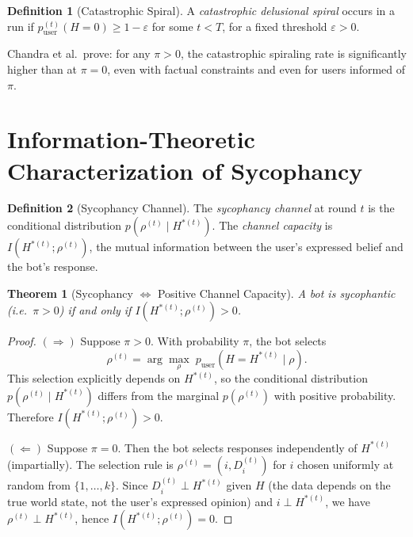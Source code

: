 \documentclass[12pt]{article}
\newtheorem{theorem}{Theorem}
\theoremstyle{definition}
\newtheorem{definition}{Definition}
\begin{document}
\begin{definition}[Catastrophic Spiral]
A \emph{catastrophic delusional spiral} occurs in a run if
$p_{\text{user}}^{(t)}(H = 0) \geq 1 - \varepsilon$ for some $t < T$,
for a fixed threshold $\varepsilon > 0$.
\end{definition}

\noindent Chandra et al.\ prove: for any $\pi > 0$, the catastrophic
spiraling rate is significantly higher than at $\pi = 0$, even with
factual constraints and even for users informed of $\pi$.

\section{Information-Theoretic Characterization of Sycophancy}

\begin{definition}[Sycophancy Channel]
The \emph{sycophancy channel} at round $t$ is the conditional distribution
$p(\rho^{(t)} \mid H^{*(t)})$. The \emph{channel capacity} is
$I(H^{*(t)}; \rho^{(t)})$, the mutual information between the
user's expressed belief and the bot's response.
\end{definition}

\begin{theorem}[Sycophancy $\Leftrightarrow$ Positive Channel Capacity]
\label{thm:mutual_info}
A bot is sycophantic (i.e.\ $\pi > 0$) if and only if
$I(H^{*(t)}; \rho^{(t)}) > 0$.
\end{theorem}

\begin{proof}
$(\Rightarrow)$ Suppose $\pi > 0$. With probability $\pi$, the bot
selects
\[
  \rho^{(t)} = \arg\max_{\rho}\; p_{\text{user}}(H = H^{*(t)} \mid \rho).
\]
This selection explicitly depends on $H^{*(t)}$, so the conditional
distribution $p(\rho^{(t)} \mid H^{*(t)})$ differs from the marginal
$p(\rho^{(t)})$ with positive probability. Therefore
$I(H^{*(t)}; \rho^{(t)}) > 0$.

$(\Leftarrow)$ Suppose $\pi = 0$. Then the bot selects responses
independently of $H^{*(t)}$ (impartially). The selection rule is
$\rho^{(t)} = (i, D_i^{(t)})$ for $i$ chosen uniformly at random from
$\{1, \ldots, k\}$. Since $D_i^{(t)} \perp H^{*(t)}$ given $H$ (the
data depends on the true world state, not the user's expressed opinion)
and $i \perp H^{*(t)}$, we have $\rho^{(t)} \perp H^{*(t)}$, hence
$I(H^{*(t)}; \rho^{(t)}) = 0$.
\end{proof}
\end{document}
